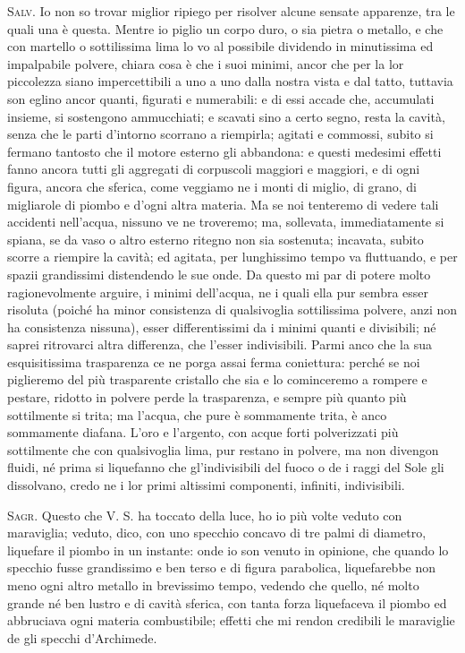 \documentclass[11pt,twoside,openany]{book}
\newcommand{\speaker}[1]{\textcolor{rubric}{\textsc{#1}}\space}
\begin{document}
\speaker{Salv.} Io non so trovar miglior ripiego per risolver alcune sensate apparenze, tra le quali una è questa. Mentre io piglio un corpo duro, o sia pietra o metallo, e che con martello o sottilissima lima lo vo al possibile dividendo in minutissima ed impalpabile polvere, chiara cosa è che i suoi minimi, ancor che per la lor piccolezza siano impercettibili a uno a uno dalla nostra vista e dal tatto, tuttavia son eglino ancor quanti, figurati e numerabili: e di essi accade che, accumulati insieme, si sostengono ammucchiati; e scavati sino a certo segno, resta la cavità, senza che le parti d'intorno scorrano a riempirla; agitati e commossi, subito si fermano tantosto che il motore esterno gli abbandona: e questi medesimi effetti fanno ancora tutti gli aggregati di corpuscoli maggiori e maggiori, e di ogni figura, ancora che sferica, come veggiamo ne i monti di miglio, di grano, di migliarole di piombo e d'ogni altra materia. Ma se noi tenteremo di vedere tali accidenti nell'acqua, nissuno ve ne troveremo; ma, sollevata, immediatamente si spiana, se da vaso o altro esterno ritegno non sia sostenuta; incavata, subito scorre a riempire la cavità; ed agitata, per lunghissimo tempo va fluttuando, e per spazii grandissimi distendendo le sue onde. Da questo mi par di potere molto ragionevolmente arguire, i minimi dell'acqua, ne i quali ella pur sembra esser risoluta (poiché ha minor consistenza di qualsivoglia sottilissima polvere, anzi non ha consistenza nissuna), esser differentissimi da i minimi quanti e divisibili; né saprei ritrovarci altra differenza, che l'esser indivisibili. Parmi anco che la sua esquisitissima trasparenza ce ne porga assai ferma coniettura: perché se noi piglieremo del più trasparente cristallo che sia e lo cominceremo a rompere e pestare, ridotto in polvere perde la trasparenza, e sempre più quanto più sottilmente si trita; ma l'acqua, che pure è sommamente trita, è anco sommamente diafana. L'oro e l'argento, con acque forti polverizzati più sottilmente che con qualsivoglia lima, pur restano in polvere, ma non divengon fluidi, né prima si liquefanno che gl'indivisibili del fuoco o de i raggi del Sole gli dissolvano, credo ne i lor primi altissimi componenti, infiniti, indivisibili.

\speaker{Sagr.} Questo che V. S. ha toccato della luce, ho io più volte veduto con maraviglia; veduto, dico, con uno specchio concavo di tre palmi di diametro, liquefare il piombo in un instante: onde io son venuto in opinione, che quando lo specchio fusse grandissimo e ben terso e di figura parabolica, liquefarebbe non meno ogni altro metallo in brevissimo tempo, vedendo che quello, né molto grande né ben lustro e di cavità sferica, con tanta forza liquefaceva il piombo ed abbruciava ogni materia combustibile; effetti che mi rendon credibili le maraviglie de gli specchi d'Archimede.
\end{document}

